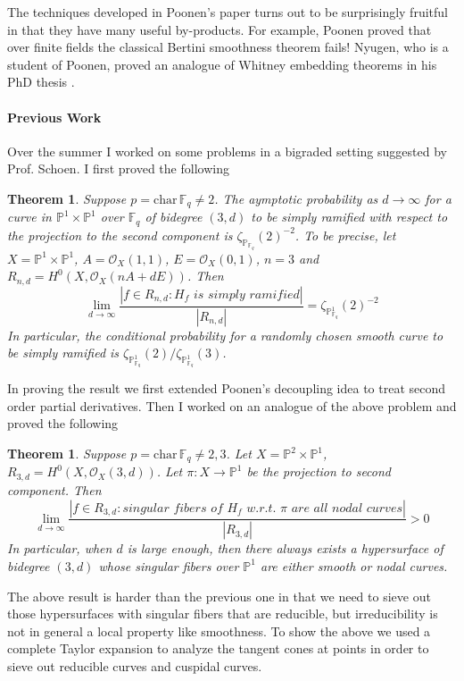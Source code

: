 \documentclass[12pt]{article}
\theoremstyle{plain}
\newtheorem{theorem}[equation]{Theorem}
\theoremstyle{definition}
\newcommand{\IF}{\mathbb{F}}
\newcommand{\IP}{\mathbb{P}}
\newcommand{\sO}{\mathcal{O}}
\newcommand{\<}{\langle}
\renewcommand{\>}{\rangle}
\begin{document}
The techniques developed in Poonen's paper \cite{PBertini} turns out to be surprisingly fruitful in that they have many useful by-products. For example, Poonen proved that over finite fields the classical Bertini smoothness theorem fails! Nyugen, who is a student of Poonen, proved an analogue of Whitney embedding theorems in his PhD thesis \cite{Nyugen}. 

\paragraph{Previous Work}
Over the summer I worked on some problems in a bigraded setting suggested by Prof. Schoen. I first proved the following
\begin{theorem}
Suppose $p = \mathrm{char}\, \IF_q \neq 2$. The aymptotic probability as $d \to \infty$ for a curve in $\IP^1 \times \IP^1$ over $\IF_q$ of bidegree $(3, d)$ to be simply ramified with respect to the projection to the second component is $\zeta_{\IP_{\IF_q}}(2)^{-2}$. To be precise, let $X = \IP^1 \times \IP^1$, $A = \sO_X(1, 1)$, $E = \sO_X(0, 1)$, $n = 3$ and $R_{n,d} = H^0(X, \sO_X(nA + d E))$. Then 
$$\lim_{d \to \infty} \frac{|f \in R_{n, d} : H_f \textit{ is simply ramified}|}{|R_{n,d}|} = \zeta_{\IP^1_{\IF_q}}(2)^{-2} $$ In particular, the conditional probability for a randomly chosen smooth curve to be simply ramified is $\zeta_{\IP^1_{\IF_q}}(2)/\zeta_{\IP^1_{\IF_q}}(3)$. 
\end{theorem}
In proving the result we first extended Poonen's decoupling idea to treat second order partial derivatives. Then I worked on an analogue of the above problem and proved the following 
\begin{theorem}
Suppose $p = \mathrm{char}\, \IF_q \neq 2, 3$. Let $X = \IP^2 \times \IP^1$, $R_{3,d} = H^0(X, \sO_X(3, d))$. Let $\pi : X \to \IP^1$ be the projection to second component. Then 
$$\lim_{d \to \infty} \frac{|f \in R_{3, d} : \textit{singular fibers of } H_f \textit{ w.r.t. $\pi$ are all nodal curves}|}{|R_{3,d}|} > 0 $$ 
In particular, when $d$ is large enough, then there always exists a hypersurface of bidegree $(3, d)$ whose singular fibers over $\IP^1$ are either smooth or nodal curves. 
\end{theorem}
The above result is harder than the previous one in that we need to sieve out those hypersurfaces with singular fibers that are reducible, but irreducibility is not in general a local property like smoothness. To show the above we used a complete Taylor expansion to analyze the tangent cones at points in order to sieve out reducible curves and cuspidal curves. 
\end{document}
